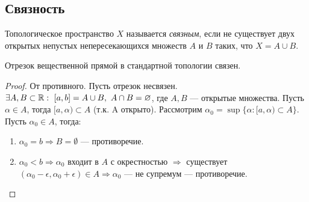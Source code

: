 \subsection{Связность}
\begin{definition}
    Топологическое пространство $X$ называется \textit{связным}, если не существует двух открытых непустых непересекающихся множеств $A$ и $B$ таких, что $X = A \cup B$.
\end{definition}

\begin{statement}
    Отрезок вещественной прямой в стандартной топологии связен.
\end{statement}
\begin{proof}
    От противного. Пусть отрезок несвязен. $\exists A, B \subset \mathbb{R}: \ [a, b] = A \cup B, \ A \cap B = \varnothing$, где $A, B$ — открытые множества. Пусть $\alpha \in A$, тогда $[a, \alpha) \subset A$ (т.к. A открыто). Рассмотрим $\alpha_0 = \sup\{ {\alpha}: [a, \alpha) \subset A\}$. \\
    Пусть $\alpha_0 \in A$, тогда:
    \begin{enumerate}
        \item $\alpha_0 = b \Longrightarrow B = \emptyset$ — противоречие.
        \item $\alpha_0 < b \Longrightarrow \alpha_0$ входит в $A$ с окрестностью $\Longrightarrow$ существует $(\alpha_0 - \epsilon, \alpha_0 + \epsilon) \in A \Longrightarrow \alpha_0$ — не супремум — противоречие.
    \end{enumerate}
\end{proof}

